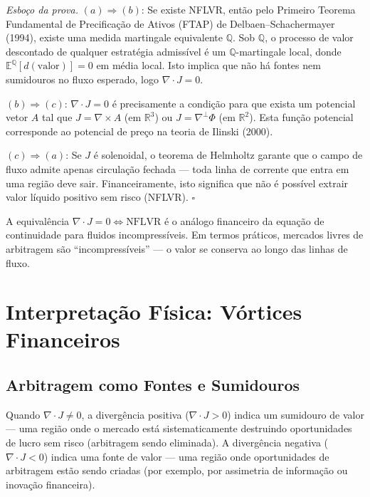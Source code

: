 \medskip
\noindent\textit{Esbo\c{c}o da prova.} $(a) \Rightarrow (b)$: Se existe NFLVR, ent\~ao pelo Primeiro Teorema Fundamental de Precifica\c{c}\~ao de Ativos (FTAP) de Delbaen--Schachermayer (1994), existe uma medida martingale equivalente $\mathbb{Q}$. Sob $\mathbb{Q}$, o processo de valor descontado de qualquer estrat\'egia admiss\'ivel \'e um $\mathbb{Q}$-martingale local, donde $\mathbb{E}^{\mathbb{Q}}[d(\text{valor})]=0$ em m\'edia local. Isto implica que n\~ao h\'a fontes nem sumidouros no fluxo esperado, logo $\nabla \cdot J = 0$.

$(b) \Rightarrow (c)$: $\nabla \cdot J = 0$ \'e precisamente a condi\c{c}\~ao para que exista um potencial vetor $A$ tal que $J = \nabla \times A$ (em $\mathbb{R}^3$) ou $J = \nabla^\perp \Phi$ (em $\mathbb{R}^2$). Esta fun\c{c}\~ao potencial corresponde ao potencial de pre\c{c}o na teoria de Ilinski (2000).

$(c) \Rightarrow (a)$: Se $J$ \'e solenoidal, o teorema de Helmholtz garante que o campo de fluxo admite apenas circula\c{c}\~ao fechada --- toda linha de corrente que entra em uma regi\~ao deve sair. Financeiramente, isto significa que n\~ao \'e poss\'ivel extrair valor l\'iquido positivo sem risco (NFLVR). $\square$

A equival\^encia $\nabla \cdot J = 0 \Leftrightarrow \text{NFLVR}$ \'e o an\'alogo financeiro da equa\c{c}\~ao de continuidade para fluidos incompress\'iveis. Em termos pr\'aticos, mercados livres de arbitragem s\~ao ``incompress\'iveis'' --- o valor se conserva ao longo das linhas de fluxo.

\section{Interpreta\c{c}\~ao F\'isica: V\'ortices Financeiros}

\subsection{Arbitragem como Fontes e Sumidouros}

Quando $\nabla \cdot J \neq 0$, a diverg\^encia positiva ($\nabla \cdot J > 0$) indica um sumidouro de valor --- uma regi\~ao onde o mercado est\'a sistematicamente destruindo oportunidades de lucro sem risco (arbitragem sendo eliminada). A diverg\^encia negativa ($\nabla \cdot J < 0$) indica uma fonte de valor --- uma regi\~ao onde oportunidades de arbitragem est\~ao sendo criadas (por exemplo, por assimetria de informa\c{c}\~ao ou inova\c{c}\~ao financeira).

